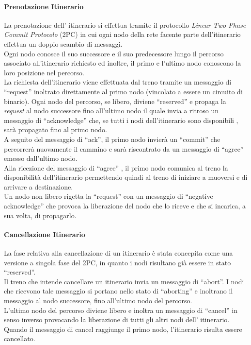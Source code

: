 \documentclass[10pt,a4paper,oneside]{report}
\begin{document}
\paragraph*{Prenotazione Itinerario}
La prenotazione dell' itinerario si effettua tramite il protocollo \emph{Linear Two Phase Commit Protocolo } (2PC) in cui ogni nodo della rete facente parte dell'itinerario effettua un doppio scambio di messaggi.\\
Ogni nodo conosce il suo successore e il suo predecessore lungo il percorso associato all'itinerario richiesto ed inoltre, il primo e l'ultimo nodo conoscono la loro posizione nel percorso.\\
La richiesta dell'itinerario viene effettuata dal treno tramite un messaggio di ``request'' inoltrato direttamente al primo nodo (vincolato a essere un circuito di binario). Ogni nodo del percorso, se libero,  diviene ``reserved'' e propaga la \emph{request} al nodo successore fino all'ultimo nodo il quale invia a ritroso un messaggio di ``acknowledge'' che, se tutti i nodi dell'itinerario sono disponibili , sarà propagato fino al primo nodo.\\
A seguito del messaggio di ``ack'', il primo nodo invierà un ``commit'' che percorrerà nuovamente il cammino e sarà riscontrato da un messaggio di ``agree'' emesso dall'ultimo nodo.\\
Alla ricezione del messaggio di ``agree'' , il primo nodo comunica al treno la disponibilità dell'itinerario permettendo quindi al treno di iniziare a muoversi e di arrivare a destinazione.\\

Un nodo non libero rigetta la ``request'' con un messaggio di ``negative acknowledge'' che provoca la liberazione del nodo che lo riceve e che si incarica, a sua volta, di propagarlo.

\paragraph*{Cancellazione Itinerario}
La fase relativa alla cancellazione di un itinerario è stata concepita come una versione a singola fase del 2PC, in quanto i nodi risultano già essere in stato ``reserved''.\\
Il treno che intende cancellare un itinerario invia un messaggio di ``abort''. I nodi che ricevono tale messaggio si portano nello stato di ``aborting'' e inoltrano il messaggio al nodo successore, fino all'ultimo nodo del percorso.\\
L'ultimo nodo del percorso diviene libero e inoltra un messaggio di ``cancel'' in senso inverso provocando la liberazione di tutti gli altri nodi dell' itinerario. Quando il messaggio di cancel raggiunge il primo nodo, l'itinerario risulta essere cancellato.
\end{document}
